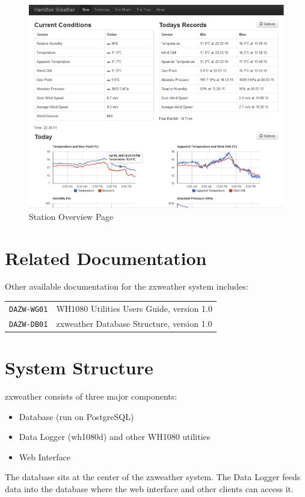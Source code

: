 \documentclass[a4paper,10pt,draft]{book}
\begin{document}
\begin {figure}[!ht]
 \centering
 \includegraphics[scale=0.574]{images/stat_overview}
 \caption{Station Overview Page}
 \label{img_station_overview}
\end {figure}

\section{Related Documentation}
Other available documentation for the zxweather system includes:

\begin{tabular}{l l}
\verb|DAZW-WG01| & WH1080 Utilities Users Guide, version 1.0 \\
\verb|DAZW-DB01| & zxweather Database Structure, version 1.0 \\
\end{tabular}

\section{System Structure}
zxweather consists of three major components:
\begin{itemize}
\item Database (run on PostgreSQL)
\item Data Logger (wh1080d) and other WH1080 utilities
\item Web Interface
\end{itemize}

The database sits at the center of the zxweather system. The Data Logger feeds data into the database where the web interface and other clients can access it.
\end{document}
